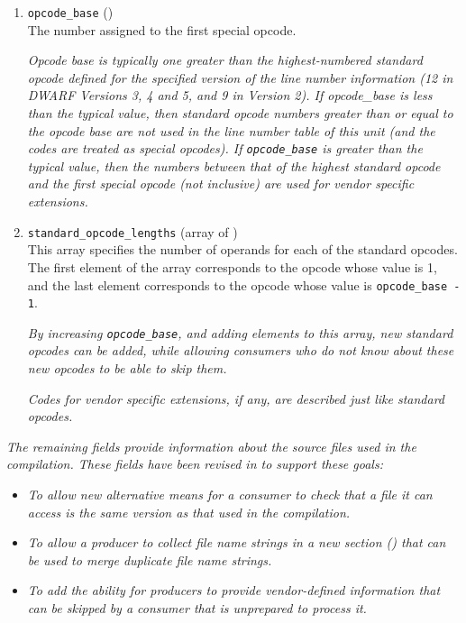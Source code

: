 \begin{enumerate}[1. ]
\item \texttt{opcode\_base} (\HFTubyte) \\
The 
number assigned to the first special opcode.

\textit{Opcode base is typically one greater than the highest-numbered
standard opcode defined for the specified version of the line
number information (12 in DWARF Versions 3, 4 and 5,
and 9 in
Version 2).  
If opcode\_base is less than the typical value,
then standard opcode numbers greater than or equal to the
opcode base are not used in the line number table of this unit
(and the codes are treated as special opcodes). If \texttt{opcode\_base}
is greater than the typical value, then the numbers between
that of the highest standard opcode and the first special
opcode (not inclusive) are used for vendor specific extensions.}

\item \texttt{standard\_opcode\_lengths} (array of \HFTubyte) \\
This array specifies the number of  operands for each
of the standard opcodes. The first element of the array
corresponds to the opcode whose value is 1, and the last
element corresponds to the opcode whose value 
is \texttt{opcode\_base - 1}.

\textit{By increasing \texttt{opcode\_base}, and adding elements to this array,
new standard opcodes can be added, while allowing consumers who
do not know about these new opcodes to be able to skip them.}

\textit{Codes for vendor specific extensions, if any, are described
just like standard opcodes.}

\setcounter{saveenumi}{\value{enumi}}
\end{enumerate}

\textit{The remaining fields provide information about the
source files used in the compilation. These fields
have been revised in \DWARFVersionV{} to support these
goals:}
\begin{itemize}
\item
    \textit{To allow new alternative means for a consumer to
    check that a file it can access is the same version
    as that used in the compilation.}
\item
    \textit{To allow a producer to collect file name strings
    in a new section (\dotdebuglinestr{}) that can be used
    to merge duplicate file name strings.}
\item
    \textit{To add the ability for producers to provide 
    vendor-defined information that can be skipped by a consumer
    that is unprepared to process it.}
\end{itemize}

